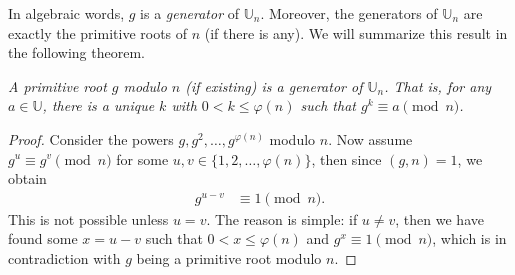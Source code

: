 \documentclass{subfile}
\begin{document}
In algebraic words, $g$ is a \textit{generator} of $\mathbb U_n$. Moreover, the generators of $\mathbb U_n$ are exactly the primitive roots of $n$ (if there is any). We will summarize this result in the following theorem.

	\begin{theorem}\slshape\label{thm:prequalsU}
		A primitive root $g$ modulo $n$ (if existing) is a generator of $\mathbb U_n$. That is, for any $a\in\mathbb{U}$, there is a unique $k$ with $0< k\leq\varphi(n)$ such that $g^k \equiv a \pmod n$.
	\end{theorem}
	
	\begin{proof}
		Consider the powers $g,g^2,\ldots,g^{\varphi (n)}$ modulo $n$. Now assume  $g^u  \equiv g^v \pmod n$ for some $u, v \in \{1,2,\ldots, \varphi(n)\}$, then since $(g,n)=1$, we obtain
			\begin{align*}
				g^{u-v}&\equiv1\pmod n.
			\end{align*}
		This is not possible unless $u=v$. The reason is simple: if $u \neq v$, then we have found some $x=u-v$ such that $0 < x \leq \varphi(n)$ and $g^x \equiv 1 \pmod n$, which is in contradiction with $g$ being a primitive root modulo $n$. 
	\end{proof}
	
\end{document}

